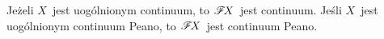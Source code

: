 \begin{lem}\label{lem-uzwarcenie_jest_metryczne}
Jeżeli $X$~jest uogólnionym continuum, to $\mathscr{F}\! X$~jest continuum. Jeśli $X$~jest uogólnionym continuum Peano, to $\mathscr{F}\! X$~jest continuum Peano.
\end{lem}

